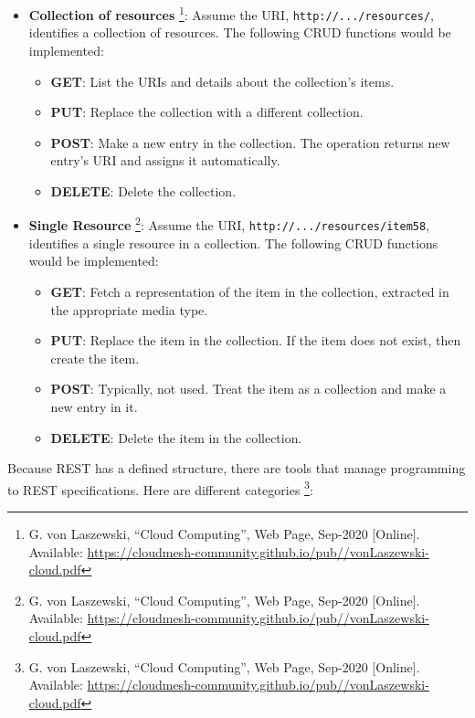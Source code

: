 \begin{itemize}
\item
  \textbf{Collection of resources} \footnote{G. von Laszewski, ``Cloud
    Computing'', Web Page, Sep-2020 {[}Online{]}. Available:
    \url{https://cloudmesh-community.github.io/pub//vonLaszewski-cloud.pdf}}:
  Assume the URI, \texttt{http://.../resources/}, identifies a
  collection of resources. The following CRUD functions would be
  implemented:

  \begin{itemize}
  \tightlist
  \item
    \textbf{GET}: List the URIs and details about the collection's
    items.
  \item
    \textbf{PUT}: Replace the collection with a different collection.
  \item
    \textbf{POST}: Make a new entry in the collection. The operation
    returns new entry's URI and assigns it automatically.
  \item
    \textbf{DELETE}: Delete the collection.
  \end{itemize}
\item
  \textbf{Single Resource} \footnote{G. von Laszewski, ``Cloud
    Computing'', Web Page, Sep-2020 {[}Online{]}. Available:
    \url{https://cloudmesh-community.github.io/pub//vonLaszewski-cloud.pdf}}:
  Assume the URI, \texttt{http://.../resources/item58}, identifies a
  single resource in a collection. The following CRUD functions would be
  implemented:

  \begin{itemize}
  \tightlist
  \item
    \textbf{GET}: Fetch a representation of the item in the collection,
    extracted in the appropriate media type.
  \item
    \textbf{PUT}: Replace the item in the collection. If the item does
    not exist, then create the item.
  \item
    \textbf{POST}: Typically, not used. Treat the item as a collection
    and make a new entry in it.
  \item
    \textbf{DELETE}: Delete the item in the collection.
  \end{itemize}
\end{itemize}

Because REST has a defined structure, there are tools that manage
programming to REST specifications. Here are different categories
\footnote{G. von Laszewski, ``Cloud Computing'', Web Page, Sep-2020
  {[}Online{]}. Available:
  \url{https://cloudmesh-community.github.io/pub//vonLaszewski-cloud.pdf}}:

